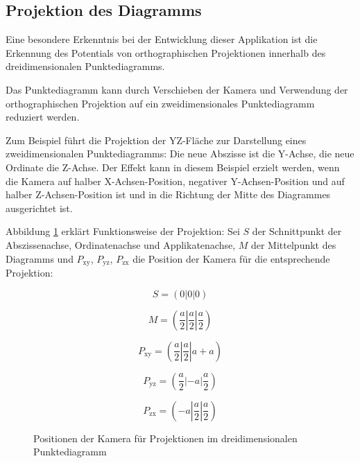 \subsection{Projektion des Diagramms}

Eine besondere Erkenntnis bei der Entwicklung dieser Applikation ist die Erkennung des Potentials von orthographischen Projektionen innerhalb des dreidimensionalen Punktediagramms.

Das Punktediagramm kann durch Verschieben der Kamera und Verwendung der orthographischen Projektion auf ein zweidimensionales Punktediagramm reduziert werden.

Zum Beispiel führt die Projektion der YZ-Fläche zur Darstellung eines zweidimensionalen Punktediagramms: Die neue Abszisse ist die Y-Achse, die neue Ordinate die Z-Achse. Der Effekt kann in diesem Beispiel erzielt werden, wenn die Kamera auf halber X-Achsen-Position, negativer Y-Achsen-Position und auf halber Z-Achsen-Position ist und in die Richtung der Mitte des Diagrammes ausgerichtet ist.

Abbildung \ref{fig:3dmath} erklärt Funktionsweise der Projektion: Sei $S$ der Schnittpunkt der Abszissenachse, Ordinatenachse und Applikatenachse, $M$ der Mittelpunkt des Diagramms und $P_{\text{xy}}$, $P_{\text{yz}}$, $P_{\text{zx}}$ die Position der Kamera für die entsprechende Projektion:

\begin{figure}[H]
$$S = (0|0|0)$$

$$M = (\frac{a}{2} | \frac{a}{2} | \frac{a}{2})$$

$$P_{\text{xy}} = (\frac{a}{2} | \frac{a}{2}| a + a)$$

$$P_{\text{yz}} = (\frac{a}{2} | -a | \frac{a}{2})$$

$$P_{\text{zx}} = (-a | \frac{a}{2}| \frac{a}{2})$$
\caption{Positionen der Kamera für Projektionen im dreidimensionalen Punktediagramm}
\label{fig:3dmath}
\end{figure}



